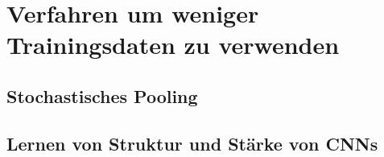 \section{Verfahren um weniger Trainingsdaten zu verwenden}

\subsection{Stochastisches Pooling}




\subsection{Lernen von Struktur und Stärke von CNNs}
